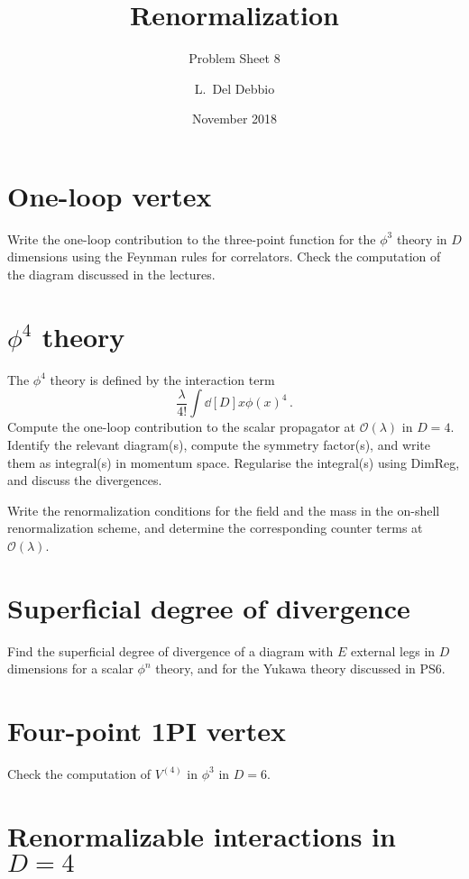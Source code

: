 \documentclass{tutorial}
\subtitle{Problem Sheet 8}
\title{Renormalization}
\author{L.~Del Debbio}
\date{November 2018}
\begin{document}
\maketitle

\section{ One-loop vertex}

Write the one-loop contribution to the three-point function for the
$\phi^3$ theory in $D$ dimensions using the Feynman rules for
correlators. Check the computation of the diagram discussed in the
lectures.

\section{ $\phi^4$ theory}

The $\phi^4$ theory is defined by the interaction term
\[
  \frac{\lambda}{4!} \int \dd[D]{x}\phi(x)^4\, .
\]
Compute the one-loop contribution to the scalar propagator at
$\mathcal{O}(\lambda)$ in $D=4$. Identify the relevant diagram(s), compute the symmetry
factor(s), and write them as integral(s) in momentum space. Regularise
the integral(s) using DimReg, and discuss the divergences.

Write the renormalization conditions for the field and the mass in
the on-shell renormalization scheme, and determine the corresponding
counter terms at $\mathcal{O}(\lambda)$.

\section{ Superficial degree of divergence}

Find the superficial degree of divergence of a diagram with $E$
external legs in $D$ dimensions for a scalar $\phi^n$ theory, and for
the Yukawa theory discussed in PS6.

\section{ Four-point 1PI vertex}

Check the computation of $V^{(4)}$ in $\phi^3$ in $D=6$.

\section{ Renormalizable interactions in $D=4$}
\end{document}
